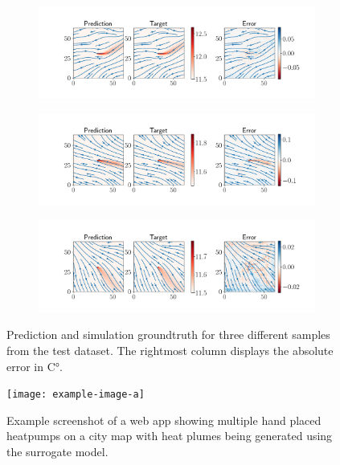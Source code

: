 \documentclass{article} %
\begin{document}


\begin{figure}[htb]
   \centering
   \begin{subfigure}{0.9\textwidth}
      \includegraphics[width=\textwidth]{img/22_comparison.png}
      \vspace{-1cm}
   \end{subfigure}
   \begin{subfigure}{0.9\textwidth}
      \includegraphics[width=\textwidth]{img/28_comparison.png}
      \vspace{-1cm}
   \end{subfigure}
   \begin{subfigure}{0.9\textwidth}
      \includegraphics[width=\textwidth]{img/42_comparison.png}
      \vspace{-1cm}
   \end{subfigure}
   \caption{Prediction and simulation groundtruth for three different samples from the test dataset. The rightmost column displays the absolute error in C°.}
\end{figure}


\begin{figure}[htb]
   \centering
   \texttt{[image: example-image-a]}
   \caption{Example screenshot of a web app showing multiple hand placed heatpumps on a city map with heat plumes being generated using the surrogate model.}
\end{figure}
\end{document}
